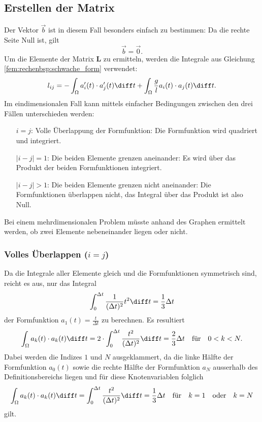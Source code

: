 \subsection{Erstellen der Matrix}
Der Vektor $\vec{b}$ ist in diesem Fall besonders einfach zu bestimmen: Da die rechte Seite Null ist, gilt
\begin{equation}
    \vec{b} = \vec{0}.
\end{equation}
Um die Elemente der Matrix $\mathbf{L}$ zu ermitteln, werden die Integrale aus Gleichung \ref{fem:rechenbsp:schwache_form} verwendet:
\begin{equation}
    l_{ij} = - \int_\Omega a_i'(t) \cdot a_j'(t) \diff t + \int_\Omega \frac{g}{l} a_i(t) \cdot a_j(t) \diff t.
\end{equation}
Im eindimensionalen Fall kann mittels einfacher Bedingungen zwischen den drei Fällen unterschieden werden:
\begin{itemize}
    \item[$i = j$:] Volle Überlappung der Formfunktion: Die Formfunktion wird quadriert und integriert. 
    \item[$|i - j| = 1$:] Die beiden Elemente grenzen aneinander: Es wird über das Produkt der beiden Formfunktionen integriert.
    \item[$|i - j| > 1$:] Die beiden Elemente grenzen nicht aneinander: Die Formfunktionen überlappen nicht, das Integral über das Produkt ist also Null.
\end{itemize}
Bei einem mehrdimensionalen Problem müsste anhand des Graphen ermittelt werden, ob zwei Elemente nebeneinander liegen oder nicht.

\subsubsection{Volles Überlappen ($i = j$)}
Da die Integrale aller Elemente gleich und die Formfunktionen symmetrisch sind, reicht es aus, nur das Integral
\begin{equation}
    \int_{0}^{\Delta t} \frac{1}{(\Delta t)^2} t^2 \diff t = \frac{1}{3} \Delta t
\end{equation}
der Formfunktion $ a_1(t) = \frac{t}{\Delta t} $ zu berechnen.
Es resultiert
\begin{equation}
    \int_\Omega a_k(t) \cdot a_k(t) \diff t = 2 \cdot \int_{0}^{\Delta t} \frac{t^2}{(\Delta t)^2} \diff t = \frac{2}{3} \Delta t \quad \text{für} \quad 0 < k < N.
\end{equation}
Dabei werden die Indizes $1$ und $N$ ausgeklammert, da die linke Hälfte der Formfunktion $a_0(t)$ sowie die rechte Hälfte der Formfunktion $a_N$ ausserhalb des Definitionsbereichs liegen und für diese Knotenvariablen folglich
\begin{equation}
    \int_\Omega a_k(t) \cdot a_k(t) \diff t = \int_{0}^{\Delta t} \frac{t^2}{(\Delta t)^2} \diff t = \frac{1}{3} \Delta t \quad \text{für} \quad k = 1 \quad \text{oder} \quad k = N
\end{equation}
gilt.

